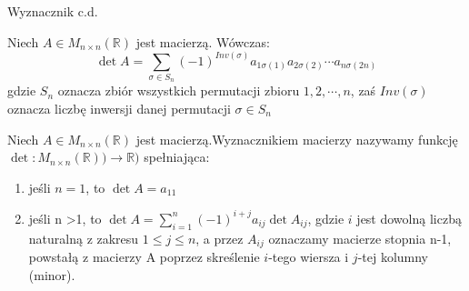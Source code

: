 \documentclass[polish,10pt]{beamer}
\begin{document}
\begin{frame}{Wyznacznik c.d.}
    \begin{definition}
    Niech $A \in M_{n \times n}(\mathbb{R})$ jest macierzą. Wówczas:
    \begin{equation*}
        \det A = \sum_{\sigma \in S_n} (-1)^{Inv(\sigma)} a_{1 {\sigma(1)}} a_{2 {\sigma(2)}} \cdots a_{n {\sigma(2n)}}
    \end{equation*}
    gdzie $S_n$ oznacza zbiór wszystkich permutacji zbioru ${1,2,\cdots,n}$, zaś $Inv(\sigma)$ oznacza liczbę inwersji danej permutacji $\sigma \in S_n$
    \end{definition}
    
    \begin{definition}
    Niech $A \in M_{n \times n}(\mathbb{R})$ jest macierzą.Wyznacznikiem macierzy nazywamy funkcję $\det:M_{n \times  n}(\mathbb{R})) \to \mathbb{R})$ spełniająca:
    \begin{enumerate}
        \item jeśli $n=1$, to $\det A = a_{1 1}$
        \item jeśli n >1, to $\det A = \sum_{i=1}^{n} (-1)^{i+j}a_{i j}\det A_{i j}$, gdzie $i$ jest dowolną liczbą naturalną z zakresu $1 \leq j \leq n$, a przez $A_{i j}$ oznaczamy macierze stopnia n-1, powstałą z macierzy A poprzez skreślenie $i$-tego wiersza i $j$-tej kolumny (minor).
    \end{enumerate}
    \end{definition}
\end{frame}
\end{document}
